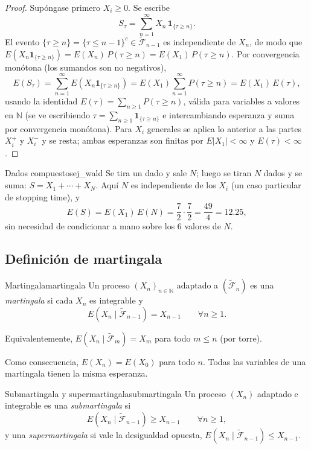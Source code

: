\documentclass[11pt, a4paper]{article}
\begin{document}
\begin{proof}
Supóngase primero $X_i \ge 0$. Se escribe
$$ S_\tau = \sum_{n=1}^\infty X_n \, \mathbf{1}_{\{\tau \ge n\}}. $$
El evento $\{\tau \ge n\} = \{\tau \le n - 1\}^c \in \widetilde{\mathcal{F}}_{n-1}$ es
independiente de $X_n$, de modo que
$E(X_n \mathbf{1}_{\{\tau \ge n\}}) = E(X_n) \, P(\tau \ge n) = E(X_1) \, P(\tau \ge n)$. Por
convergencia monótona (los sumandos son no negativos),
$$ E(S_\tau) = \sum_{n=1}^\infty E(X_n \mathbf{1}_{\{\tau \ge n\}}) = E(X_1)
\sum_{n=1}^\infty P(\tau \ge n) = E(X_1) \, E(\tau), $$
usando la identidad $E(\tau) = \sum_{n \ge 1} P(\tau \ge n)$, válida para variables a valores
en $\mathbb{N}$ (se ve escribiendo $\tau = \sum_{n \ge 1} \mathbf{1}_{\{\tau \ge n\}}$ e
intercambiando esperanza y suma por convergencia monótona). Para $X_i$ generales se aplica lo
anterior a las partes $X_i^+$ y $X_i^-$ y se resta; ambas esperanzas son finitas por
$E|X_1| < \infty$ y $E(\tau) < \infty$.
\end{proof}

\begin{ejemplo}{Dados compuestos}{ej_wald}
Se tira un dado y sale $N$; luego se tiran $N$ dados y se suma: $S = X_1 + \cdots + X_N$. Aquí
$N$ es independiente de los $X_i$ (un caso particular de stopping time), y
$$ E(S) = E(X_1) \, E(N) = \frac{7}{2} \cdot \frac{7}{2} = \frac{49}{4} = 12.25, $$
sin necesidad de condicionar a mano sobre los $6$ valores de $N$.
\end{ejemplo}

\subsection{Definición de martingala}

\begin{definicion}{Martingala}{martingala}
Un proceso $(X_n)_{n \in \mathbb{N}}$ adaptado a $(\widetilde{\mathcal{F}}_n)$ es una
\emph{martingala} si cada $X_n$ es integrable y
$$ E(X_n \mid \widetilde{\mathcal{F}}_{n-1}) = X_{n-1} \qquad \forall n \ge 1. $$
\end{definicion}

\obs Equivalentemente, $E(X_n \mid \widetilde{\mathcal{F}}_m) = X_m$ para todo $m \le n$ (por
torre).

\obs Como consecuencia, $E(X_n) = E(X_0)$ para todo $n$. Todas las variables de una martingala
tienen la misma esperanza.

\begin{definicion}{Submartingala y supermartingala}{submartingala}
Un proceso $(X_n)$ adaptado e integrable es una \emph{submartingala} si
$$ E(X_n \mid \widetilde{\mathcal{F}}_{n-1}) \ge X_{n-1} \qquad \forall n \ge 1, $$
y una \emph{supermartingala} si vale la desigualdad opuesta,
$E(X_n \mid \widetilde{\mathcal{F}}_{n-1}) \le X_{n-1}$.
\end{definicion}
\end{document}
